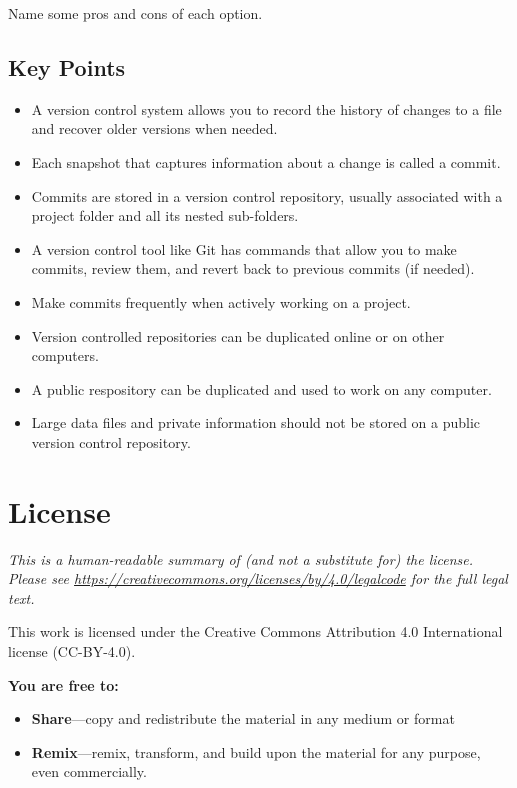 \documentclass[]{Nemilov}
\providecommand{\tightlist}{%
  \setlength{\itemsep}{0pt}\setlength{\parskip}{0pt}}
\begin{document}
Name some pros and cons of each option.

\hypertarget{py-version-control-keypoints}{%
\section{Key Points}\label{py-version-control-keypoints}}

\begin{itemize}
\tightlist
\item
  A version control system allows you to record the history of changes to a file
  and recover older versions when needed.
\item
  Each snapshot that captures information about a change is called a commit.
\item
  Commits are stored in a version control repository,
  usually associated with a project folder and all its nested sub-folders.
\item
  A version control tool like Git has commands that allow you to make commits,
  review them,
  and revert back to previous commits (if needed).
\item
  Make commits frequently when actively working on a project.
\item
  Version controlled repositories can be duplicated online or on other computers.
\item
  A public respository can be duplicated and used to work on any computer.
\item
  Large data files and private information should not be stored on a public version control repository.
\end{itemize}

\hypertarget{appendix-appendix}{%
\appendix}


\hypertarget{license}{%
\chapter{License}\label{license}}

\emph{This is a human-readable summary of (and not a substitute for) the license.
Please see \url{https://creativecommons.org/licenses/by/4.0/legalcode} for the full legal text.}

This work is licensed under the Creative Commons Attribution 4.0
International license (CC-BY-4.0).

\textbf{You are free to:}

\begin{itemize}
\item
  \textbf{Share}---copy and redistribute the material in any medium or
  format
\item
  \textbf{Remix}---remix, transform, and build upon the material for any
  purpose, even commercially.
\end{itemize}
\end{document}
